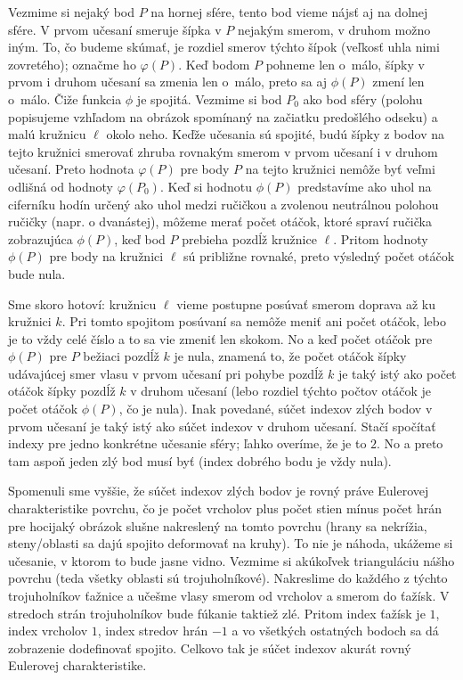 \documentclass[a4paper]{article}
\begin{document}
Vezmime si nejaký bod $P$ na hornej sfére, tento bod vieme nájsť aj na dolnej sfére. V prvom učesaní smeruje šípka v $P$ nejakým smerom, v druhom možno iným. To, čo budeme skúmať, je rozdiel smerov týchto šípok (veľkosť uhla nimi zovretého); označme ho $\varphi(P)$. Keď bodom $P$ pohneme len o~málo, šípky v prvom i druhom učesaní sa zmenia len o~málo, preto sa aj $\phi(P)$ zmení len o~málo. Čiže funkcia $\phi$ je spojitá. Vezmime si bod $P_0$ ako  bod sféry (polohu popisujeme vzhľadom na obrázok spomínaný na začiatku predošlého odseku) a malú kružnicu $\ell$ okolo neho. Keďže učesania sú spojité, budú šípky z bodov na tejto kružnici smerovať zhruba rovnakým smerom v prvom učesaní i v druhom učesaní. Preto hodnota $\varphi(P)$ pre body $P$ na tejto kružnici nemôže byť veľmi odlišná od hodnoty $\varphi(P_0)$. Keď si hodnotu $\phi(P)$ predstavíme ako uhol na ciferníku hodín určený ako uhol medzi ručičkou a zvolenou neutrálnou polohou ručičky (napr. o dvanástej), môžeme merať počet otáčok, ktoré spraví ručička zobrazujúca $\phi(P)$, keď bod $P$ prebieha pozdĺž kružnice $\ell$. Pritom hodnoty $\phi(P)$ pre body na kružnici $\ell$ sú približne rovnaké, preto výsledný počet otáčok bude nula.

Sme skoro hotoví: kružnicu $\ell$ vieme postupne posúvať smerom doprava až ku kružnici $k$. Pri tomto spojitom posúvaní sa nemôže meniť ani počet otáčok, lebo je to vždy celé číslo a to sa vie zmeniť len skokom. No a keď počet otáčok pre $\phi(P)$ pre $P$ bežiaci pozdĺž $k$ je nula, znamená to, že počet otáčok šípky udávajúcej smer vlasu v prvom učesaní pri pohybe pozdĺž $k$ je taký istý ako počet otáčok šípky pozdĺž $k$ v druhom učesaní (lebo rozdiel týchto počtov otáčok je počet otáčok $\phi(P)$, čo je nula). Inak povedané, súčet indexov zlých bodov v prvom učesaní je taký istý ako súčet indexov v druhom učesaní. Stačí spočítať indexy pre jedno konkrétne učesanie sféry; ľahko overíme, že je to $2$. No a preto tam aspoň jeden zlý bod musí byť (index dobrého bodu je vždy nula).

Spomenuli sme vyššie, že súčet indexov zlých bodov je rovný práve Eulerovej charakteristike povrchu, čo je počet vrcholov plus počet stien mínus počet hrán pre hocijaký obrázok slušne nakreslený na tomto povrchu (hrany sa nekrížia, steny/oblasti sa dajú spojito deformovať na kruhy). To nie je náhoda, ukážeme si učesanie, v ktorom to bude jasne vidno. Vezmime si akúkoľvek trianguláciu nášho povrchu (teda všetky oblasti sú trojuholníkové). Nakreslime do každého z týchto trojuholníkov ťažnice a učešme vlasy smerom od vrcholov a smerom do ťažísk. V stredoch strán trojuholníkov bude fúkanie taktiež zlé. Pritom index ťažísk je $1$, index vrcholov $1$, index stredov hrán $-1$ a vo všetkých ostatných bodoch sa dá zobrazenie dodefinovať spojito. Celkovo tak je súčet indexov akurát rovný Eulerovej charakteristike.
\end{document}

